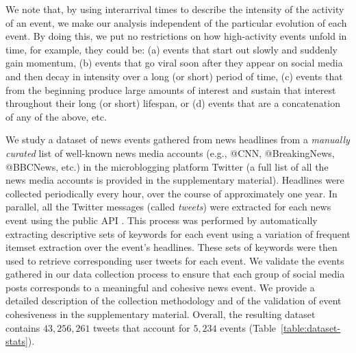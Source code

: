 \documentclass[10pt,letterpaper]{article}
\newcommand{\newtext}[1]{{\leavevmode\color{blue}#1}}
\begin{document}
We note that, by using interarrival times to describe the intensity of the
activity of an event, we make our analysis independent of the particular
evolution of each event. By doing this, we put no restrictions on how
high-activity events unfold in time, for example, they could be: (a) events
that start out slowly and
suddenly gain momentum, (b) events that go viral soon after they appear on
social media and then decay in intensity over a long (or short) period of
time, (c) events that from the beginning produce large amounts of interest and
sustain that interest throughout their long (or short) lifespan, or (d)
events that are a concatenation of any of the above, etc.


We study a dataset of news events gathered from news
headlines from a \emph{manually curated} list of well-known news media
accounts (e.g., @CNN, @BreakingNews, @BBCNews, etc.) in the
microblogging platform Twitter \cite{Twitter_website}
(a full list of all the news media
accounts is provided in the supplementary material). Headlines were
collected periodically every hour, over the course of approximately
one year. In parallel, all the Twitter messages (called \emph{tweets})
were extracted for each news event using the public
API \cite{Twitter_API}.
This process was performed by automatically extracting descriptive
sets of keywords for each event using a variation of frequent itemset
extraction \cite{Tan_Steinbach_Kumar} over the event's headlines.
These sets of keywords were then used to retrieve corresponding user
tweets for each event. We validate the events gathered in our
data collection process to ensure that each group of social media
posts corresponds to a meaningful and cohesive news event. We provide a detailed
description of the collection methodology and of the validation of event
cohesiveness in the supplementary material. Overall, the resulting dataset contains
$43,256,261$ tweets that account for $5,234$ events (Table~\ref{table:dataset-stats}).
\end{document}
